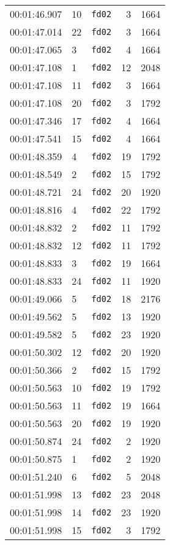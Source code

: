 \documentclass{article}
\begin{document}
\begin{longtable}{lllrr}
00:01:46.907 & 10 & \texttt{fd02} & 3 & 1664 \\
00:01:47.014 & 22 & \texttt{fd02} & 3 & 1664 \\
00:01:47.065 & 3 & \texttt{fd02} & 4 & 1664 \\
00:01:47.108 & 1 & \texttt{fd02} & 12 & 2048 \\
00:01:47.108 & 11 & \texttt{fd02} & 3 & 1664 \\
00:01:47.108 & 20 & \texttt{fd02} & 3 & 1792 \\
00:01:47.346 & 17 & \texttt{fd02} & 4 & 1664 \\
00:01:47.541 & 15 & \texttt{fd02} & 4 & 1664 \\
00:01:48.359 & 4 & \texttt{fd02} & 19 & 1792 \\
00:01:48.549 & 2 & \texttt{fd02} & 15 & 1792 \\
00:01:48.721 & 24 & \texttt{fd02} & 20 & 1920 \\
00:01:48.816 & 4 & \texttt{fd02} & 22 & 1792 \\
00:01:48.832 & 2 & \texttt{fd02} & 11 & 1792 \\
00:01:48.832 & 12 & \texttt{fd02} & 11 & 1792 \\
00:01:48.833 & 3 & \texttt{fd02} & 19 & 1664 \\
00:01:48.833 & 24 & \texttt{fd02} & 11 & 1920 \\
00:01:49.066 & 5 & \texttt{fd02} & 18 & 2176 \\
00:01:49.562 & 5 & \texttt{fd02} & 13 & 1920 \\
00:01:49.582 & 5 & \texttt{fd02} & 23 & 1920 \\
00:01:50.302 & 12 & \texttt{fd02} & 20 & 1920 \\
00:01:50.366 & 2 & \texttt{fd02} & 15 & 1792 \\
00:01:50.563 & 10 & \texttt{fd02} & 19 & 1792 \\
00:01:50.563 & 11 & \texttt{fd02} & 19 & 1664 \\
00:01:50.563 & 20 & \texttt{fd02} & 19 & 1920 \\
00:01:50.874 & 24 & \texttt{fd02} & 2 & 1920 \\
00:01:50.875 & 1 & \texttt{fd02} & 2 & 1920 \\
00:01:51.240 & 6 & \texttt{fd02} & 5 & 2048 \\
00:01:51.998 & 13 & \texttt{fd02} & 23 & 2048 \\
00:01:51.998 & 14 & \texttt{fd02} & 23 & 1920 \\
00:01:51.998 & 15 & \texttt{fd02} & 3 & 1792 \\

\end{longtable}
\end{document}
